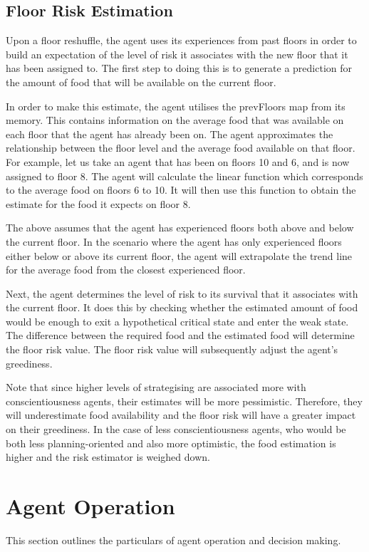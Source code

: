 \subsection{Floor Risk Estimation}
\label{subsec: Floor Map}
Upon a floor reshuffle, the agent uses its experiences from past floors in order to build an expectation of the level of risk it associates with the new floor that it has been assigned to. The first step to doing this is to generate a prediction for the amount of food that will be available on the current floor. 

In order to make this estimate, the agent utilises the prevFloors map from its memory. This contains information on the average food that was available on each floor that the agent has already been on. The agent approximates the relationship between the floor level and the average food available on that floor. For example, let us take an agent that has been on floors 10 and 6, and is now assigned to floor 8. The agent will calculate the linear function which corresponds to the average food on floors 6 to 10. It will then use this function to obtain the estimate for the food it expects on floor 8. 

The above assumes that the agent has experienced floors both above and below the current floor. In the scenario where the agent has only experienced floors either below or above its current floor, the agent will extrapolate the trend line for the average food from the closest experienced floor. 

Next, the agent determines the level of risk to its survival that it associates with the current floor. It does this by checking whether the estimated amount of food would be enough to exit a hypothetical critical state and enter the weak state. The difference between the required food and the estimated food will determine the floor risk value. The floor risk value will subsequently adjust the agent's greediness. 

Note that since higher levels of strategising are associated more with conscientiousness agents, their estimates will be more pessimistic. Therefore, they will underestimate food availability and the floor risk will have a greater impact on their greediness. In the case of less conscientiousness agents, who would be both less planning-oriented and also more optimistic, the food estimation is higher and the risk estimator is weighed down.

\section{Agent Operation}
\label{sec: Agent Operation}
This section outlines the particulars of agent operation and decision making.

